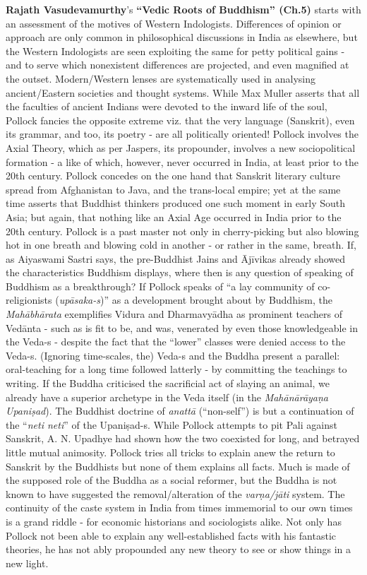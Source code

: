 \textbf{Rajath Vasudevamurthy}’s \textbf{“Vedic Roots of Buddhism” (Ch.5)} starts with an assessment of the motives of Western Indologists. Differences of opinion or approach are only common in philosophical discussions in India as elsewhere, but the Western Indologists are seen exploiting the same for petty political gains - and to serve which nonexistent differences are projected, and even magnified at the outset. Modern/Western lenses are systematically used in analysing ancient/Eastern societies and thought systems. While Max Muller asserts that all the faculties of ancient Indians were devoted to the inward life of the soul, Pollock fancies the opposite extreme viz. that the very language (Sanskrit), even its grammar, and too, its poetry - are all politically oriented! Pollock involves the Axial Theory, which as per Jaspers, its propounder, involves a new sociopolitical formation - a like of which, however, never occurred in India, at least prior to the 20th century. Pollock concedes on the one hand that Sanskrit literary culture spread from Afghanistan to Java, and the trans-local empire; yet at the same time asserts that Buddhist thinkers produced one such moment in early South Asia; but again, that nothing like an Axial Age occurred in India prior to the 20th century. Pollock is a past master not only in cherry-picking but also blowing hot in one breath and blowing cold in another - or rather in the same, breath. If, as Aiyaswami Sastri says, the pre-Buddhist Jains and Ājīvikas already showed the characteristics Buddhism displays, where then is any question of speaking of Buddhism as a breakthrough? If Pollock speaks of “a lay community of co-religionists (\textit{upāsaka-s})” as a development brought about by Buddhism, the \textit{Mahābhārata} exemplifies Vidura and Dharmavyādha as prominent teachers of Vedānta - such as is fit to be, and was, venerated by even those knowledgeable in the Veda-s - despite the fact that the “lower” classes were denied access to the Veda-s. (Ignoring time-scales, the) Veda-s and the Buddha present a parallel: oral-teaching for a long time followed latterly - by committing the teachings to writing. If the Buddha criticised the sacrificial act of slaying an animal, we already have a superior archetype in the Veda itself (in the \textit{Mahānārāyaṇa Upaniṣad}). The Buddhist doctrine of \textit{anattā} (“non-self”) is but a continuation of the “\textit{neti neti}” of the Upaniṣad-s. While Pollock attempts to pit Pali against Sanskrit, A. N. Upadhye had shown how the two coexisted for long, and betrayed little mutual animosity. Pollock tries all tricks to explain anew the return to Sanskrit by the Buddhists but none of them explains all facts. Much is made of the supposed role of the Buddha as a social reformer, but the Buddha is not known to have suggested the removal/alteration of the \textit{varṇa/jāti} system. The continuity of the caste system in India from times immemorial to our own times is a grand riddle - for economic historians and sociologists alike. Not only has Pollock not been able to explain any well-established facts with his fantastic theories, he has not ably propounded any new theory to see or show things in a new light.

